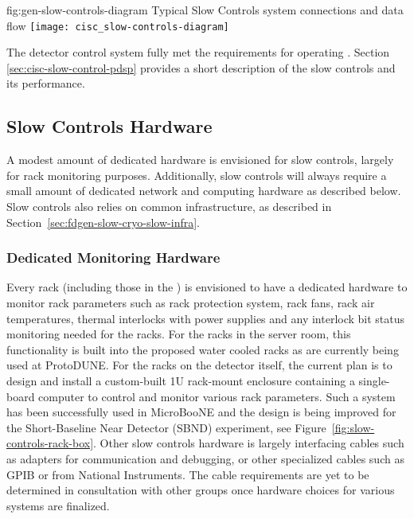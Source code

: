 \begin{dunefigure}{fig:gen-slow-controls-diagram}
{Typical Slow Controls system connections and data flow}
\texttt{[image: cisc\_slow-controls-diagram]}
\end{dunefigure}

The  detector control system\cite{pdspdcs_proc} fully met the requirements for operating . Section \ref{sec:cisc-slow-control-pdsp} provides a short description of the  slow controls and its performance.

 \subsection{Slow Controls Hardware}
\label{sec:fdgen-slow-cryo-hdwr}

A modest amount of dedicated hardware is envisioned for slow controls, largely for rack monitoring purposes. Additionally, slow controls will always require a small amount of dedicated network and
computing hardware as described below. Slow controls also relies on common
infrastructure, as described in
Section~\ref{sec:fdgen-slow-cryo-slow-infra}.

\subsubsection{Dedicated Monitoring Hardware}
Every rack (including those in the ) is envisioned to have a dedicated hardware to monitor rack parameters such as rack protection system, rack fans, rack air temperatures, thermal interlocks with power supplies and any interlock bit status monitoring needed for the racks. For the racks in the  server room, this functionality is built into the proposed water cooled racks as are currently being used at ProtoDUNE.  For the racks on the detector itself, the current plan is to design and install a custom-built 1U rack-mount enclosure containing a single-board computer to control and monitor various rack parameters. Such a system has been successfully used in MicroBooNE and the design is being improved for the Short-Baseline Near Detector (SBND) experiment, see Figure~\ref{fig:slow-controls-rack-box}. Other slow controls hardware is largely interfacing cables such as adapters for communication and debugging, or other specialized cables such as GPIB or from National Instruments. The cable requirements are yet to be determined in consultation with other groups once hardware choices for various systems are finalized.

